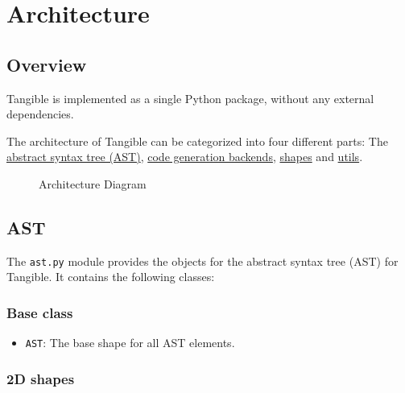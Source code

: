 
\chapter{Architecture}

\label{ch:architecture}


\section{Overview}\label{sec:overview}

Tangible is implemented as a single Python package, without any external
dependencies.

The architecture of Tangible can be categorized into four different parts: The
\hyperref[sec:ast]{abstract syntax tree (AST)}, \hyperref[sec:backends]{code
generation backends}, \hyperref[sec:shapes]{shapes} and
\hyperref[sec:utils]{utils}.

\begin{figure}[h]
	\centering
	
	\caption{Architecture Diagram}
	\label{img:architecture}
\end{figure}


\section{AST}\label{sec:ast}

The \texttt{ast.py} module provides the objects for the abstract syntax tree
(AST) for Tangible. It contains the following classes:

\subsection{Base class}

\begin{itemize}
	\item \texttt{AST}: The base shape for all AST elements.
\end{itemize}

\subsection{2D shapes}

